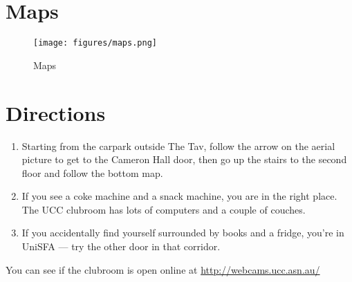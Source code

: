 \label{FindClubroom}



\section{Maps}


\begin{figure}[H]
	\centering
	\texttt{[image: figures/maps.png]}
	\caption{Maps} 
	\label{maps.png}
\end{figure}

\pagebreak


\section{Directions}

\begin{enumerate}
	\item Starting from the carpark outside The Tav, follow the arrow on the aerial picture to get to the Cameron Hall door, then go up the stairs to the second floor and follow the bottom map.
	\item If you see a coke machine and a snack machine, you are in the right place. The UCC clubroom has lots of computers and a couple of couches.
	\item If you accidentally find yourself surrounded by books and a fridge, you're in UniSFA --- try the other door in that corridor.
\end{enumerate}

You can see if the clubroom is open online at \url{http://webcams.ucc.asn.au/}

\begin{comment}
\begin{figure}[H]
	\centering
	\texttt{[image: figures/webcam2.jpg]}
	\caption{This is what the clubroom looks like}
	\label{webcam2.jpg}
\end{figure}
\end{comment}


